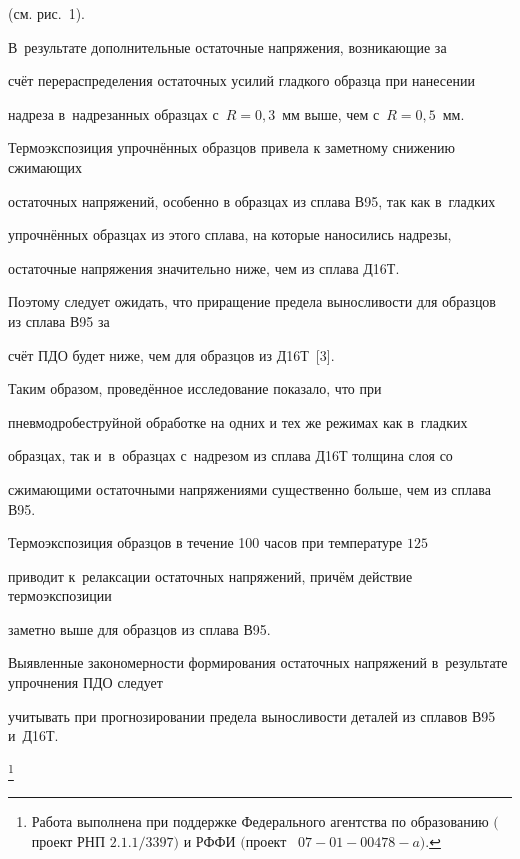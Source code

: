(см. рис.~1).

В~результате дополнительные остаточные напряжения, возникающие за

счёт перераспределения остаточных усилий гладкого образца при нанесении

надреза в~надрезанных образцах с~$R=0,3$~мм выше, чем с~$R=0,5$~мм.



Термоэкспозиция упрочнённых образцов привела к заметному снижению сжимающих

остаточных напряжений, особенно в образцах из сплава В95, так как в~гладких

упрочнённых образцах из этого сплава, на которые наносились надрезы,

остаточные напряжения значительно ниже, чем из сплава Д16Т.

Поэтому следует ожидать, что приращение предела выносливости для образцов из сплава В95 за

счёт ПДО будет ниже, чем для образцов из Д16Т~[3].



Таким образом, проведённое исследование показало, что при

пневмодробеструйной обработке на одних и тех же режимах как в~гладких

образцах, так и~в~образцах с~надрезом из сплава Д16Т толщина слоя со

сжимающими остаточными напряжениями существенно больше, чем из сплава В95.

Термоэкспозиция образцов в течение 100 часов при температуре $125$\,\textcelsius{}

приводит к~релаксации остаточных напряжений, причём действие термоэкспозиции

заметно выше для образцов из сплава В95.

Выявленные закономерности формирования остаточных напряжений в~результате упрочнения ПДО следует

учитывать при прогнозировании предела выносливости деталей из сплавов В95 и~Д16Т.



{\thanks{Работа выполнена при поддержке Федерального агентства по образованию $($проект РНП $2.1.1/3397)$ и РФФИ $($проект \rm \No~$07{-}01{-}00478{-}a).$}}



\vspace{3mm}



